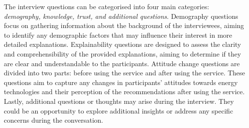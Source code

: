 The interview questions can be categorised into four main categories: \emph{demography, knowledge, trust, and additional questions}.
Demography questions focus on gathering information about the background of the interviewees, aiming to identify any demographic factors that may influence their interest in more detailed explanations.
Explainability questions are designed to assess the clarity and comprehensibility of the provided explanations, aiming to determine if they are clear and understandable to the participants. 
Attitude change questions are divided into two parts: before using the service and after using the service. 
These questions aim to capture any changes in participants' attitudes towards energy technologies and their perception of the recommendations after using the service.
Lastly, additional questions or thoughts may arise during the interview. 
They could be an opportunity to explore additional insights or address any specific concerns during the conversation. 


